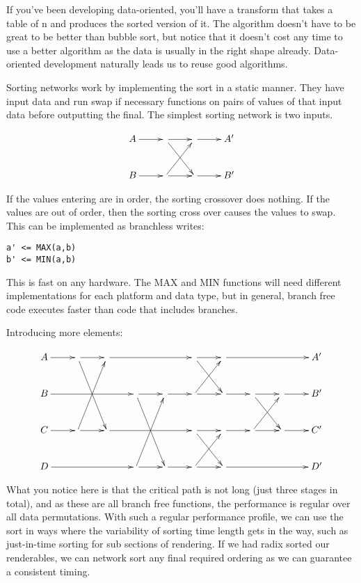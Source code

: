 If you've been developing data-oriented, you'll have a transform that takes a
table of n and produces the sorted version of it. The algorithm doesn't have to
be great to be better than bubble sort, but notice that it doesn't cost any
time to use a better algorithm as the data is usually in the right shape
already. Data-oriented development naturally leads us to reuse good algorithms.

Sorting networks work by implementing the sort in a static manner. They have
input data and run swap if necessary functions on pairs of values of that input
data before outputting the final. The simplest sorting network is two inputs.

\begin{displaymath}
	\xymatrix{
	A \ar[r] & \ar[r] \ar[dr] & \ar[r] & A' \\
	B \ar[r] & \ar[r] \ar[ur] & \ar[r] & B' }
\end{displaymath}

If the values entering are in order, the sorting crossover does nothing. If the
values are out of order, then the sorting cross over causes the values to swap.
This can be implemented as branchless writes:

\begin{verbatim}
a' <= MAX(a,b)
b' <= MIN(a,b)
\end{verbatim}

This is fast on any hardware. The MAX and MIN functions will need different
implementations for each platform and data type, but in general, branch free
code executes faster than code that includes branches.

Introducing more elements:

\begin{displaymath}
	\xymatrix{
	A \ar[r]   & \ar[r] \ar[ddr] & \ar[rrr] &                 &        & \ar[r] \ar[dr] & \ar[rrr] &                &        & A' \\
	B \ar[rrr] &                 &          & \ar[ddr] \ar[r] & \ar[r] & \ar[r] \ar[ur] & \ar[r]   & \ar[r] \ar[dr] & \ar[r] & B' \\
	C \ar[r]   & \ar[r] \ar[uur] & \ar[rrr] &                 &        & \ar[r] \ar[dr] & \ar[r]   & \ar[r] \ar[ur] & \ar[r] & C' \\
	D \ar[rrr] &                 &          & \ar[uur] \ar[r] & \ar[r] & \ar[r] \ar[ur] & \ar[rrr] &                &        & D' }
\end{displaymath}

What you notice here is that the critical path is not long (just three stages
in total), and as these are all branch free functions, the performance is
regular over all data permutations. With such a regular performance profile, we
can use the sort in ways where the variability of sorting time length gets in
the way, such as just-in-time sorting for sub sections of rendering. If we had
radix sorted our renderables, we can network sort any final required ordering
as we can guarantee a consistent timing.

